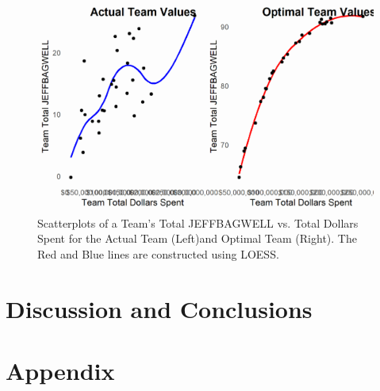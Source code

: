 \documentclass{article}
\begin{document}
\begin{figure}[h]
\caption{Scatterplots of a Team's Total JEFFBAGWELL vs. Total Dollars Spent for the Actual Team (Left)and Optimal Team (Right). The Red and Blue lines are constructed using LOESS.} 
\label{fig:cowplot}
\centering
\includegraphics[width=0.7\paperwidth, scale=1.25]{bwar_salary_scatter_cowplot.png}
\end{figure}


%

\section{Discussion and Conclusions}


%
%

\section{Appendix}
\end{document}
